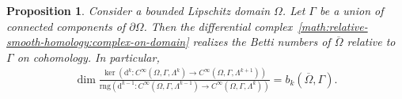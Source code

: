 \documentclass[10pt,a4paper]{amsart}
\newtheorem{proposition}[theorem]{Proposition}
\theoremstyle{definition}
\theoremstyle{remark}
\numberwithin{equation}{section}
\newcommand{\closure}{\overline}
\newcommand{\cartan}{{\mathrm d}}
\newcommand{\Domain}{{\Omega}}
\newcommand{\Alt}[1]{\Lambda^{#1}}
\newcommand{\rng}{\mathrm{rng}}
\begin{document}
\begin{proposition}\label{proposition:relative-smooth-homology}
    Consider a bounded Lipschitz domain $\Domain$.
    Let $\Gamma$ be a union of connected components of $\partial\Domain$. 
    Then the differential complex~\eqref{math:relative-smooth-homology:complex-on-domain}
    realizes the Betti numbers of $\closure\Domain$ relative to $\Gamma$ on cohomology. In particular, 
    \begin{align*}
        \dim 
        \frac{ 
            \ker\left( \cartan^{k} : C^{\infty}(\Domain,\Gamma,\Alt{k}) \to C^{\infty}(\Domain,\Gamma,\Alt{k+1}) \right)
        }{
            \rng\left( \cartan^{k-1} : C^{\infty}(\Domain,\Gamma,\Alt{k-1}) \to C^{\infty}(\Domain,\Gamma,\Alt{k}) \right)
        } 
        = 
        b_{k}(\closure\Domain,\Gamma)
        .
    \end{align*}
\end{proposition}
\end{document}
